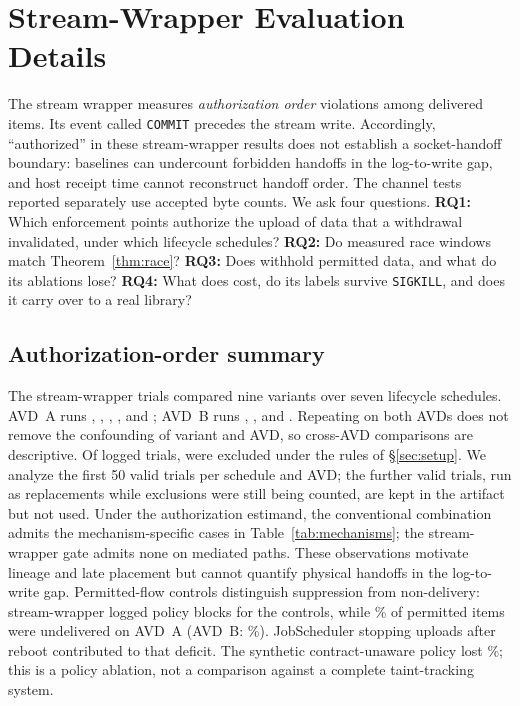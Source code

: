 \section{Stream-Wrapper Evaluation Details}


The stream wrapper measures \emph{authorization order} violations among delivered
items. Its event called \texttt{COMMIT} precedes the stream write. Accordingly, ``authorized''
in these stream-wrapper results does not establish a socket-handoff boundary: baselines can undercount forbidden handoffs
in the log-to-write gap, and host receipt time cannot reconstruct handoff order. The channel tests
reported separately use accepted byte counts. We ask four questions.
\textbf{RQ1:} Which enforcement points authorize the upload of data that a withdrawal invalidated, under which lifecycle schedules?
\textbf{RQ2:} Do measured race windows match Theorem~\ref{thm:race}?
\textbf{RQ3:} Does \sys withhold permitted data, and what do its ablations lose?
\textbf{RQ4:} What does \sys cost, do its labels survive \texttt{SIGKILL}, and does it carry over to a real library?

\subsection{Authorization-order summary}
\label{app:stream}
The stream-wrapper \nTrialsValid{} trials compared nine variants over seven lifecycle schedules.
AVD~A runs , , , ,  and ; AVD~B runs
, ,  and . Repeating  on both AVDs does not remove the
confounding of variant and AVD, so cross-AVD comparisons are descriptive. Of \nTrialsTotal{} logged trials, \nInvalid{}
were excluded under the rules of \S\ref{sec:setup}. We analyze the first 50 valid trials per schedule and AVD; the
\nValidUnused{} further valid trials, run as replacements while exclusions were still being counted, are kept in the
artifact but not used.
Under the authorization estimand, the conventional combination admits the mechanism-specific cases in
Table~\ref{tab:mechanisms}; the stream-wrapper \sys gate admits none on mediated paths. These observations motivate
lineage and late placement but cannot quantify physical handoffs in the log-to-write gap.
Permitted-flow controls distinguish suppression from non-delivery: stream-wrapper \sys logged
\rdFpBlocks{} policy blocks for the controls, while \% of permitted items
were undelivered on AVD~A (AVD~B: \%). JobScheduler stopping uploads after reboot contributed
to that deficit. The synthetic contract-unaware policy lost \%; this
is a policy ablation, not a comparison against a complete taint-tracking system.



